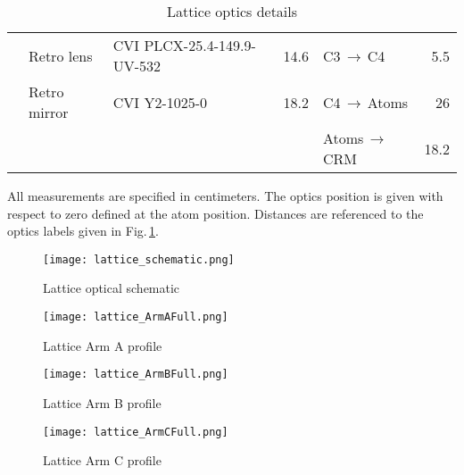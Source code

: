 \begin{table}[]
{{\begin{tabular}{@{}|c|llr|lr|@{}}
 & Retro lens & CVI PLCX-25.4-149.9-UV-532 & 14.6 & C3$\,\rightarrow\,$C4 & 5.5 \\
 & Retro mirror & CVI Y2-1025-0 & 18.2 & C4$\,\rightarrow\,$Atoms & 26 \\
 &  &  &  & Atoms$\,\rightarrow\,$CRM & 18.2 \\ \bottomrule
\end{tabular}%
}}
\caption{Lattice optics details}{All measurements are specified in centimeters. The optics position is given with respect to zero defined at the atom position. Distances are referenced to the optics labels given in Fig.\,\ref{fig:532schematic}.}
\label{tab:532sys}
\end{table}

	\begin{figure} 
		\centerline{
		\texttt{[image: lattice\_schematic.png]}}
		\caption{Lattice optical schematic}
		\label{fig:532schematic}
	\end{figure}
	
	\begin{figure} 
		\centerline{
		\texttt{[image: lattice\_ArmAFull.png]}}
		\caption{Lattice Arm A profile}
		\label{fig:532armAProfile}
	\end{figure}
	
	\begin{figure} 
		\centerline{
		\texttt{[image: lattice\_ArmBFull.png]}}
		\caption{Lattice Arm B profile}
		\label{fig:532armBProfile}
	\end{figure}
	
	\begin{figure} 
		\centerline{
		\texttt{[image: lattice\_ArmCFull.png]}}
		\caption{Lattice Arm C profile}
		\label{fig:532armCProfile}
	\end{figure}

